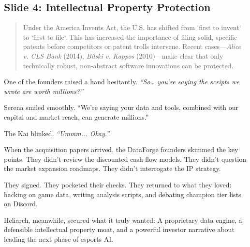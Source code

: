 \subsection{Slide 4: Intellectual Property Protection} 

\begin{quote}
    Under the America Invents Act, the U.S. has shifted from `first to invent` to `first to file`. This has increased the importance of filing solid, specific patents before competitors or patent trolls intervene. Recent cases—\textit{Alice v. CLS Bank} (2014), \textit{Bilski v. Kappos} (2010)—make clear that only technically robust, non-abstract software innovations can be protected.
\end{quote}

One of the founders raised a hand hesitantly.  
\textit{``So… you’re saying the scripts we wrote are worth millions?''}

Serena smiled smoothly.  
``We’re saying your data and tools, combined with our capital and market reach, can generate millions.''

The Kai blinked.  \textit{``Ummm... Okay.''}

When the acquisition papers arrived, the DataForge founders skimmed the key points. They didn’t review the discounted cash flow models. They didn’t question the market expansion roadmaps. They didn’t interrogate the IP strategy.

They signed.  
They pocketed their checks.  
They returned to what they loved: hacking on game data, writing analysis scripts, and debating champion tier lists on Discord.

Heliarch, meanwhile, secured what it truly wanted:  
A proprietary data engine, a defensible intellectual property moat, and a powerful investor narrative about leading the next phase of esports AI.

\medskip

